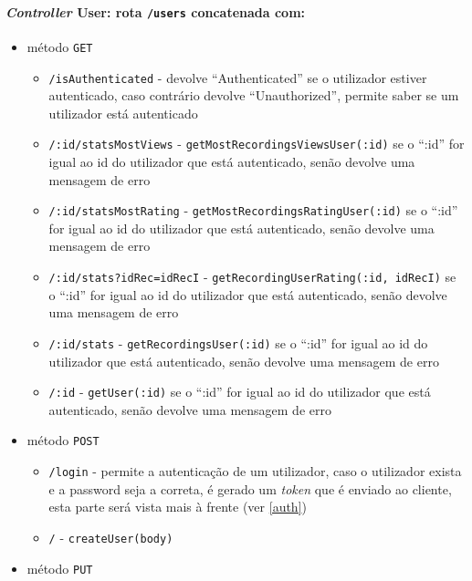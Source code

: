 \documentclass{article}
\begin{document}
\paragraph{\textit{Controller} User: rota \texttt{/users} concatenada com:}
    \begin{itemize}
        \item método \texttt{GET}
            \begin{itemize}
                \item \texttt{/isAuthenticated} - devolve ``Authenticated'' se o utilizador estiver autenticado, caso contrário devolve ``Unauthorized'', permite saber se um utilizador está autenticado
                \item \texttt{/:id/statsMostViews} - \texttt{getMostRecordingsViewsUser(:id)} se o ``:id'' for igual ao id do utilizador que está autenticado, senão devolve uma mensagem de erro
                \item \texttt{/:id/statsMostRating} - \texttt{getMostRecordingsRatingUser(:id)} se o ``:id'' for igual ao id do utilizador que está autenticado, senão devolve uma mensagem de erro
                \item \texttt{/:id/stats?idRec=idRecI} - \texttt{getRecordingUserRating(:id, idRecI)} se o ``:id'' for igual ao id do utilizador que está autenticado, senão devolve uma mensagem de erro
                \item \texttt{/:id/stats} - \texttt{getRecordingsUser(:id)} se o ``:id'' for igual ao id do utilizador que está autenticado, senão devolve uma mensagem de erro
                \item \texttt{/:id} - \texttt{getUser(:id)} se o ``:id'' for igual ao id do utilizador que está autenticado, senão devolve uma mensagem de erro
            \end{itemize}
        \item método \texttt{POST}
            \begin{itemize}
                \item \texttt{/login} - permite a autenticação de um utilizador, caso o utilizador exista e a password seja a correta, é gerado um \textit{token} que é enviado ao cliente, esta parte será vista mais à frente (ver \ref{auth}) 
                \item \texttt{/} - \texttt{createUser(body)}
            \end{itemize}
        \item método \texttt{PUT}
            \begin{itemize}

\end{itemize}
\end{itemize}
\end{document}
